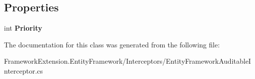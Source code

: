 \subsection*{Properties}
\begin{DoxyCompactItemize}
\item 
\hypertarget{class_framework_extension_1_1_entity_framework_1_1_interceptors_1_1_entity_framework_auditable_interceptor_a5d109fa0dc420c3e236dd98ddcb6eade}{int {\bfseries Priority}}\label{class_framework_extension_1_1_entity_framework_1_1_interceptors_1_1_entity_framework_auditable_interceptor_a5d109fa0dc420c3e236dd98ddcb6eade}

\end{DoxyCompactItemize}


The documentation for this class was generated from the following file\-:\begin{DoxyCompactItemize}
\item 
Framework\-Extension.\-Entity\-Framework/\-Interceptors/Entity\-Framework\-Auditable\-Interceptor.\-cs\end{DoxyCompactItemize}

